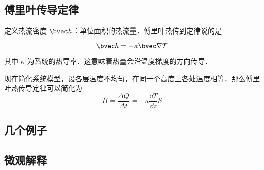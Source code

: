 
\subsection{傅里叶传导定律}
定义热流密度 $\bvec h$：单位面积的热流量．傅里叶热传到定律说的是

\begin{equation}
\bvec h = -\kappa \bvec \nabla T
\end{equation}

其中 $\kappa$ 为系统的热导率．这意味着热量会沿温度梯度的方向传导．

现在简化系统模型，设各层温度不均匀，在同一个高度上各处温度相等．那么傅里叶热传导定律可以简化为
\begin{equation}
H=\frac{\Delta Q}{\Delta t}=-\kappa \frac{\dd T}{\dd z}S
\end{equation}

\subsection{几个例子}

\subsection{微观解释}